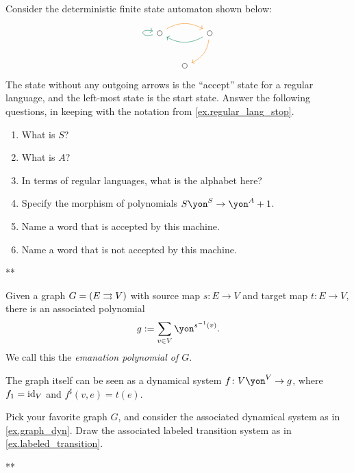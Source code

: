 \documentclass[Book-Poly]{subfiles}
\begin{document}
\begin{exercise}\label{exc.det_fsa_misc_398}
Consider the deterministic finite state automaton shown below:
\[
\begin{tikzcd}[column sep=small]
	\LMO{}\ar[rr, bend left, orange]\ar[loop left, dgreen]&&
	\LMO{}\ar[dl, bend left, orange]\ar[ll, dgreen, bend left]\\&
	\LMO{}
\end{tikzcd}
\]
The state without any outgoing arrows is the ``accept'' state for a regular language, and the left-most state is the start state. Answer the following questions, in keeping with the notation from \cref{ex.regular_lang_stop}.

\begin{enumerate}
	\item What is $S$?
	\item What is $A$?
	\item In terms of regular languages, what is the alphabet here?
	\item Specify the morphism of polynomials $S\yon^S\to\yon^A+1$.
	\item Name a word that is accepted by this machine.
	\item Name a word that is not accepted by this machine.
\qedhere
\end{enumerate}
\begin{solution}
**
\end{solution}
\end{exercise}

\begin{example}[Graphs] \label{ex.graph_dyn}
Given a graph $G = (E \rightrightarrows V)$ with source map $s \colon E \to V$ and target map $t \colon E \to V$, there is an associated polynomial
\[
    g := \sum_{v \in V} \yon^{s\inv(v)}.
\]
We call this the \emph{emanation polynomial of $G$}.

The graph itself can be seen as a dynamical system $f \colon V\yon^V \to g$, where $f_1 = \mathrm{id}_V$ and $f^\sharp(v, e) = t(e)$.
\end{example}

\begin{exercise}
Pick your favorite graph $G$, and consider the associated dynamical system as in \cref{ex.graph_dyn}.
Draw the associated labeled transition system as in \cref{ex.labeled_transition}.
\begin{solution}
**
\end{solution}
\end{exercise}
\end{document}
